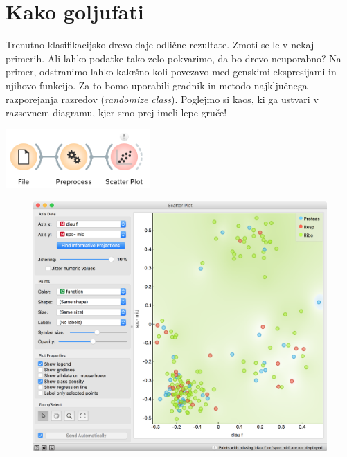 \chapter{Kako goljufati}
\label{ch:kako-gouljufati}

Trenutno klasifikacijsko drevo daje odlične rezultate. Zmoti se le v nekaj primerih. Ali lahko podatke tako zelo pokvarimo, da bo drevo neuporabno? Na primer, odstranimo lahko kakršno koli povezavo med genskimi ekspresijami in njihovo funkcijo. Za to bomo uporabili gradnik  in metodo najključnega razporejanja razredov (\textit{randomize class}). Poglejmo si kaos, ki ga ustvari v razsevnem diagramu, kjer smo prej imeli lepe gruče!

\begin{marginfigure}
    \centering
    \includegraphics[width=55mm]{workflow1.png}
    \caption{$\;$}
    \label{fig:workflow1}
\end{marginfigure}

\begin{figure}[h]
    \includegraphics[width=\linewidth]{scatterplot.png}
    \caption{$\;$}
\end{figure}

